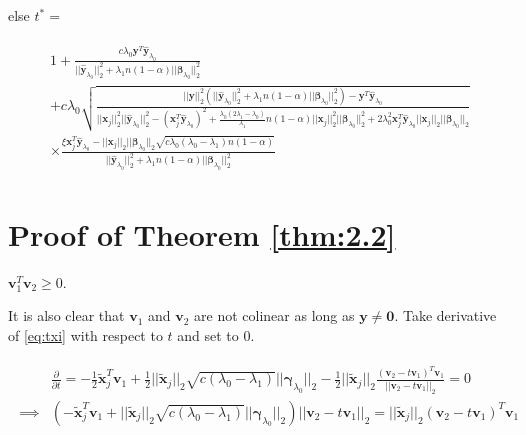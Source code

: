 else $t^*=$

\begin{gather}
    \begin{aligned}
        1+\frac{c\lambda_0\boldsymbol y^T\hat{\boldsymbol y}_{\lambda_0}}{||\hat{\boldsymbol y}_{\lambda_0}||_2^2+\lambda_1n(1-\alpha)||\boldsymbol\beta_{\lambda_0}||_2^2}\\
        +c\lambda_0\sqrt{\frac{||\boldsymbol y||_2^2\left(||\hat{\boldsymbol y}_{\lambda_0}||_2^2+\lambda_1n(1-\alpha)||\boldsymbol\beta_{\lambda_0}||_2^2\right)-\boldsymbol y^T\hat{\boldsymbol y}_{\lambda_0}}{||\boldsymbol x_j||_2^2||\hat{\boldsymbol y}_{\lambda_0}||_2^2-(\boldsymbol x_j^T\hat{\boldsymbol y}_{\lambda_0})^2+\frac{\lambda_0(2\lambda_1-\lambda_0)}{\lambda_1}n(1-\alpha)||\boldsymbol x_j||_2^2||\boldsymbol\beta_{\lambda_0}||_2^2+2\lambda_0^2\boldsymbol x_j^T\hat{\boldsymbol y}_{\lambda_0}||\boldsymbol x_j||_2||\boldsymbol\beta_{\lambda_0}||_2}}\\
        \times \frac{\xi \boldsymbol x_j^T\hat{\boldsymbol y}_{\lambda_0}-||\boldsymbol x_j||_2||\boldsymbol\beta_{\lambda_0}||_2\sqrt{c\lambda_0(\lambda_0-\lambda_1)n(1-\alpha)}}{||\hat{\boldsymbol y}_{\lambda_0}||_2^2+\lambda_1n(1-\alpha)||\boldsymbol\beta_{\lambda_0}||_2^2}
    \end{aligned}
\end{gather}

\section{Proof of Theorem \ref{thm:2.2}}

\begin{lemma}
    \label{lem:2.4.1}
    $\boldsymbol v_1^T \boldsymbol v_2\geq 0$.
\end{lemma}

It is also clear that $\boldsymbol v_1$ and $\boldsymbol v_2$ are not colinear as long as $\boldsymbol y\neq \boldsymbol0$. Take derivative of \eqref{eq:txi} with respect to $t$ and set to 0.

\begin{gather}
    \label{eq:2.4.1}
    \begin{aligned}
        &\frac{\partial}{\partial t}=-\frac{1}{2}\tilde{\boldsymbol x}_j^T\boldsymbol v_1+\frac{1}{2}||\tilde{\boldsymbol x}_j||_2\sqrt{c(\lambda_0-\lambda_1)}||\boldsymbol\gamma_{\lambda_0}||_2-\frac{1}{2}||\tilde{\boldsymbol x}_j||_2\frac{(\boldsymbol v_2-t\boldsymbol v_1)^T\boldsymbol v_1}{||\boldsymbol v_2-t\boldsymbol v_1||_2}=0\\
        \implies & \left(-\tilde{\boldsymbol x}_j^T\boldsymbol v_1+||\tilde{\boldsymbol x}_j||_2\sqrt{c(\lambda_0-\lambda_1)}||\boldsymbol\gamma_{\lambda_0}||_2\right)||\boldsymbol v_2-t\boldsymbol v_1||_2=||\tilde{\boldsymbol x}_j||_2(\boldsymbol v_2-t\boldsymbol v_1)^T\boldsymbol v_1
    \end{aligned}
\end{gather}

